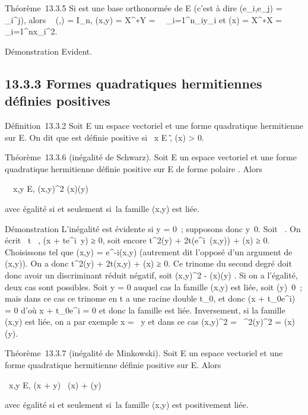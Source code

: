 \documentclass[]{article}
\begin{document}
Théorème~13.3.5 Si  est une base orthonormée de E (c'est à dire
\phi(e_i,e_j) = \delta_i^j), alors
\mathrmMat~ (\phi,) =
I_n, \phi(x,y) = X^∗Y =\
\sum ~
_i=1^n\overlinex_iy_i
et \Phi(x) = X^∗X =\
\sum ~
_i=1^nx_i^2.

Démonstration Evident.

\subsection{13.3.3 Formes quadratiques hermitiennes définies positives}

Définition~13.3.2 Soit E un \mathbb{C} espace vectoriel et \Phi une forme
quadratique hermitienne sur E. On dit que \Phi est définie positive si
\forall~x \in E \diagdown\0\~,
\Phi(x) > 0.

Théorème~13.3.6 (inégalité de Schwarz). Soit E un  espace vectoriel et
\Phi une forme quadratique hermitienne définie positive sur E de forme
polaire \phi. Alors

\forall~~x,y \in E,
\phi(x,y)^2 \leq \Phi(x)\Phi(y)

avec égalité si et seulement si~la famille (x,y) est liée.

Démonstration L'inégalité est évidente si y = 0~; supposons donc
y\neq~0. Soit \theta \in {}~. On écrit
\forall~t \in \mathbb{R}~, \Phi(x + te^i\theta~y) ≥ 0, soit
encore t^2\Phi(y) +
2t\mathrmRe(e^i\theta~\phi(x,y))
+ \Phi(x) ≥ 0. Choisissons \theta tel que \phi(x,y) =
e^-i\theta\phi(x,y) (autrement dit l'opposé d'un
argument de \phi(x,y)). On a donc t^2\Phi(y) +
2t\phi(x,y) + \Phi(x) ≥ 0. Ce trinome du second degré doit
donc avoir un discriminant réduit négatif, soit
\phi(x,y)^2 - \Phi(x)\Phi(y) \leq 0. Si on a
l'égalité, deux cas sont possibles. Soit y = 0 auquel cas la famille
(x,y) est liée, soit \Phi(y)\neq~0~; mais dans ce
cas ce trinome en t a une racine double t_0, et donc \Phi(x +
t_0e^i\thetay) = 0 d'où x + t_0e^i\thetay
= 0 et donc la famille est liée. Inversement, si la famille (x,y) est
liée, on a par exemple x = \lambda~y et dans ce cas
\phi(x,y)^2 =
\lambda~^2\Phi(y)^2 = \Phi(x)\Phi(y).

Théorème~13.3.7 (inégalité de Minkowski). Soit E un  espace vectoriel
et \Phi une forme quadratique hermitienne définie positive sur E. Alors

\forall~x,y \in E, \sqrt\Phi(x + y)~
\leq\sqrt\Phi(x) + \sqrt\Phi(y)

avec égalité si et seulement si~la famille (x,y) est positivement liée.
\end{document}
